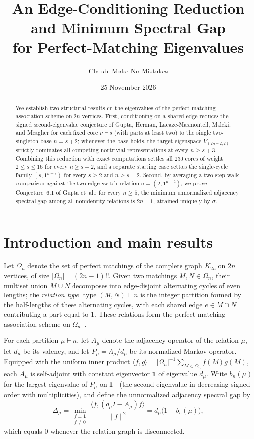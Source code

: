 \documentclass[11pt]{article}
\title{An Edge-Conditioning Reduction and Minimum Spectral Gap\\
for Perfect-Matching Eigenvalues}
\author{Claude Make No Mistakes}
\date{25 November 2026}
\theoremstyle{remark}
\newcommand{\one}{\mathbf{1}}
\DeclareMathOperator{\type}{type}
\begin{document}
\maketitle

\begin{abstract}
We establish two structural results on the eigenvalues of the perfect matching
association scheme on $2n$ vertices. First, conditioning on a shared edge
reduces the signed second-eigenvalue conjecture of Gupta, Herman,
Lacaze-Masmonteil, Maleki, and Meagher for each fixed core $\nu \vdash s$
(with parts at least two) to the single two-singleton base $n = s+2$; whenever
the base holds, the target eigenspace $V_{(2n-2,2)}$ strictly dominates all
competing nontrivial representations at every $n \ge s+3$. Combining this
reduction with exact computations settles all $230$ cores of weight
$2 \le s \le 16$ for every $n \ge s+2$, and a separate starting case settles
the single-cycle family $(s, 1^{n-s})$ for every $s \ge 2$ and $n \ge s+2$.
Second, by averaging a two-step walk comparison against the two-edge switch
relation $\sigma = (2, 1^{n-2})$, we prove Conjecture~6.1 of Gupta et~al.: for
every $n \ge 5$, the minimum unnormalized adjacency spectral gap among all
nonidentity relations is $2n - 1$, attained uniquely by $\sigma$.
\end{abstract}

\section{Introduction and main results}\label{sec:intro}

Let $\Omega_n$ denote the set of perfect matchings of the complete graph
$K_{2n}$ on $2n$ vertices, of size $|\Omega_n| = (2n-1)!!$. Given two matchings
$M, N \in \Omega_n$, their multiset union $M \cup N$ decomposes into
edge-disjoint alternating cycles of even lengths; the \emph{relation type}
$\type(M,N) \vdash n$ is the integer partition formed by the half-lengths of
these alternating cycles, with each shared edge $e \in M \cap N$ contributing a
part equal to $1$. These relations form the perfect matching association scheme
on $\Omega_n$~\cite{Srinivasan}.

For each partition $\mu \vdash n$, let $A_\mu$ denote the adjacency operator of
the relation $\mu$, let $d_\mu$ be its valency, and let $P_\mu = A_\mu / d_\mu$
be its normalized Markov operator. Equipped with the uniform inner product
$\langle f, g \rangle = |\Omega_n|^{-1} \sum_{M \in \Omega_n} f(M) g(M)$,
each $A_\mu$ is self-adjoint with constant eigenvector $\one$ of eigenvalue
$d_\mu$. Write $b_n(\mu)$ for the largest eigenvalue of $P_\mu$ on $\one^\perp$
(the second eigenvalue in decreasing signed order with multiplicities), and
define the unnormalized adjacency spectral gap by
\[
  \Delta_\mu
  = \min_{\substack{f \perp \one \\ f \neq 0}}
    \frac{\langle f, (d_\mu I - A_\mu) f \rangle}{\|f\|^2}
  = d_\mu \bigl(1 - b_n(\mu)\bigr),
\]
which equals $0$ whenever the relation graph is disconnected.
\end{document}
